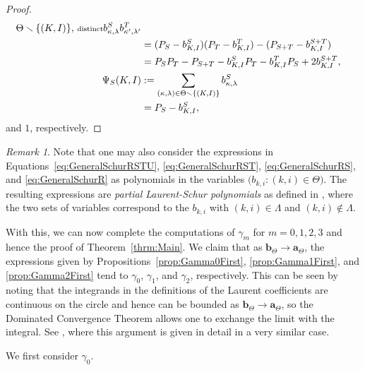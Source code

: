 \documentclass{amsart}
\theoremstyle{definition}
\theoremstyle{remark}
\newtheorem{remark}[theorem]{Remark}
\newcommand{\bs}{\boldsymbol}
\begin{document}
\begin{proof}
\begin{align*}
{{                \Theta\smallsetminus \{(K,I)\},\,
                    \mbox{\scriptsize distinct}}}
                b_{\kappa,\lambda}^S b_{\kappa^\prime,\lambda^\prime}^T
    \\&=    (P_S - b_{K,I}^S)(P_T - b_{K,I}^T) - (P_{S+T} - b_{K,I}^{S+T})
    \\&=    P_S P_T - P_{S+T} - b_{K,I}^S P_T - b_{K,I}^T P_S + 2 b_{K,I}^{S+T},
\\
    \Psi_{S}(K,I)
    &:=     \sum\limits_{\substack{(\kappa,\lambda) \in \Theta\smallsetminus \{(K,I)\}}}
                b_{\kappa,\lambda}^S
    \\&=    P_S - b_{K,I}^S,
\end{align*}
and $1$, respectively.
\end{proof}

\begin{remark}
\label{rem:PartialSchur}
Note that one may also consider the expressions in Equations~\eqref{eq:GeneralSchurRSTU},
\eqref{eq:GeneralSchurRST}, \eqref{eq:GeneralSchurRS}, and \eqref{eq:GeneralSchurR} as polynomials in the variables
$\big(b_{k,i} : (k,i)\in\Theta\big)$. The resulting expressions are \emph{partial Laurent-Schur
polynomials} as defined in \cite[Section 5]{CowieHerbigSeatonHerden}, where the two sets of
variables correspond to the $b_{k,i}$ with $(k,i)\in\Lambda$ and $(k,i)\notin\Lambda$.
\end{remark}


With this, we can now complete the computations of $\gamma_m$ for $m=0,1,2,3$ and hence the proof
of Theorem~\ref{thrm:Main}. We claim that as $\bs{b}_\Theta\to\bs{a}_\Theta$, the expressions given by
Propositions~\ref{prop:Gamma0First}, \ref{prop:Gamma1First}, and \ref{prop:Gamma2First}
tend to $\gamma_0$, $\gamma_1$, and $\gamma_2$, respectively. This can be seen by noting that the integrands in the definitions of the Laurent
coefficients are continuous on the circle and hence can be bounded as $\bs{b}_\Theta\to\bs{a}_\Theta$, so the
Dominated Convergence Theorem allows one to exchange the limit with the integral. See
\cite[end of Section 5-2]{HerbigSeaton}, where this argument is given in detail in a very similar case.

We first consider $\gamma_0$.
\end{document}
